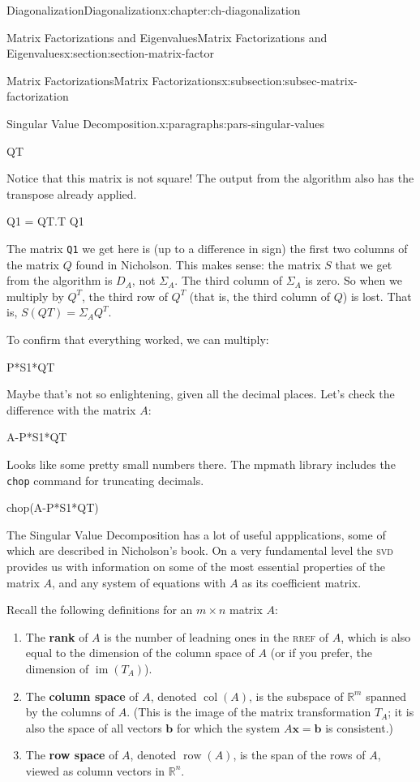 \documentclass[oneside,10pt,]{book}
\newcommand{\mono}[1]{\texttt{#1}}
\newcommand{\initialism}[1]{\textsc{\MakeLowercase{#1}}}
\newcommand{\terminology}[1]{\textbf{#1}}
\numberwithin{equation}{section}
\newcommand{\R}{\mathbb{R}}
\newcommand{\im}{\operatorname{im}}
\newcommand{\csp}{\operatorname{col}}
\newcommand{\xx}{\mathbf{x}}
\begin{document}
\begin{chapterptx}{Diagonalization}{}{Diagonalization}{}{}{x:chapter:ch-diagonalization}
\begin{sectionptx}{Matrix Factorizations and Eigenvalues}{}{Matrix Factorizations and Eigenvalues}{}{}{x:section:section-matrix-factor}
\begin{subsectionptx}{Matrix Factorizations}{}{Matrix Factorizations}{}{}{x:subsection:subsec-matrix-factorization}
\begin{paragraphs}{Singular Value Decomposition.}{x:paragraphs:pars-singular-values}
\begin{sageinput}
QT
\end{sageinput}
Notice that this matrix is not square! The output from the algorithm also has the transpose already applied.%
\begin{sageinput}
Q1 = QT.T
Q1
\end{sageinput}
The matrix \mono{Q1} we get here is (up to a difference in sign) the first two columns of the matrix \(Q\) found in Nicholson. This makes sense: the matrix \(S\) that we get from the algorithm is \(D_A\), not \(\Sigma_A\). The third column of \(\Sigma_A\) is zero. So when we multiply by \(Q^T\), the third row of \(Q^T\) (that is, the third column of \(Q\)) is lost. That is, \(S(QT)=\Sigma_AQ^T\).%
\par
To confirm that everything worked, we can multiply:%
\begin{sageinput}
P*S1*QT
\end{sageinput}
Maybe that's not so enlightening, given all the decimal places. Let's check the difference with the matrix \(A\):%
\begin{sageinput}
A-P*S1*QT
\end{sageinput}
Looks like some pretty small numbers there. The mpmath library includes the \mono{chop} command for truncating decimals.%
\begin{sageinput}
chop(A-P*S1*QT)
\end{sageinput}
The Singular Value Decomposition has a lot of useful appplications, some of which are described in Nicholson's book. On a very fundamental level the \initialism{SVD} provides us with information on some of the most essential properties of the matrix \(A\), and any system of equations with \(A\) as its coefficient matrix.%
\par
Recall the following definitions for an \(m\times n\) matrix \(A\):%
\begin{enumerate}
\item{}The \terminology{rank} of \(A\) is the number of leadning ones in the \initialism{RREF} of \(A\), which is also equal to the dimension of the column space of \(A\) (or if you prefer, the dimension of \(\im (T_A)\)).%
\item{}The \terminology{column space} of \(A\), denoted \(\csp(A)\), is the subspace of \(\R^m\) spanned by the columns of \(A\). (This is the image of the matrix transformation \(T_A\); it is also the space of all vectors \(\mathbf{b}\) for which the system \(A\xx=\mathbf{b}\) is consistent.)%
\item{}The \terminology{row space} of \(A\), denoted \(\operatorname{row}(A)\), is the span of the rows of \(A\), viewed as column vectors in \(\R^n\).%

\end{enumerate}
\end{paragraphs}
\end{subsectionptx}
\end{sectionptx}
\end{chapterptx}
\end{document}
